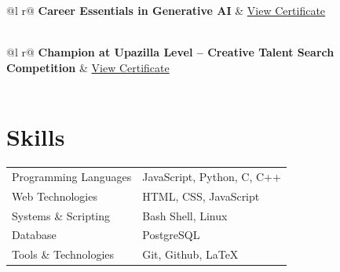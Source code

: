 \documentclass[a4paper,12pt]{article}
\begin{document}
\begin{tabularx}{\linewidth}{ @{}l r@{} }
\textbf{Career Essentials in Generative AI} & \hfill \href{https://www.linkedin.com/learning/certificates/6f72b0e48a5817dc558db49ca0673a70bb89d664f12973b92fb28f3bbaa996db}{View Certificate} \\[3.75pt]
 \\
\end{tabularx}

\begin{tabularx}{\linewidth}{ @{}l r@{} }
\textbf{Champion at Upazilla Level – Creative Talent Search Competition} & \hfill \href{https://placeholder-link.com}{View Certificate} \\[3.75pt]
 \\
\end{tabularx}

\section{Skills}
\begin{tabularx}{\linewidth}{@{}l X@{}}

Programming Languages & \normalsize{JavaScript, Python, C, C++} \\

Web Technologies & \normalsize{HTML, CSS, JavaScript} \\

Systems \& Scripting & \normalsize{Bash Shell, Linux} \\

Database & \normalsize{PostgreSQL} \\

Tools \& Technologies & \normalsize{Git, Github, LaTeX} \\

\end{tabularx}

\vfill
{}
\end{document}
